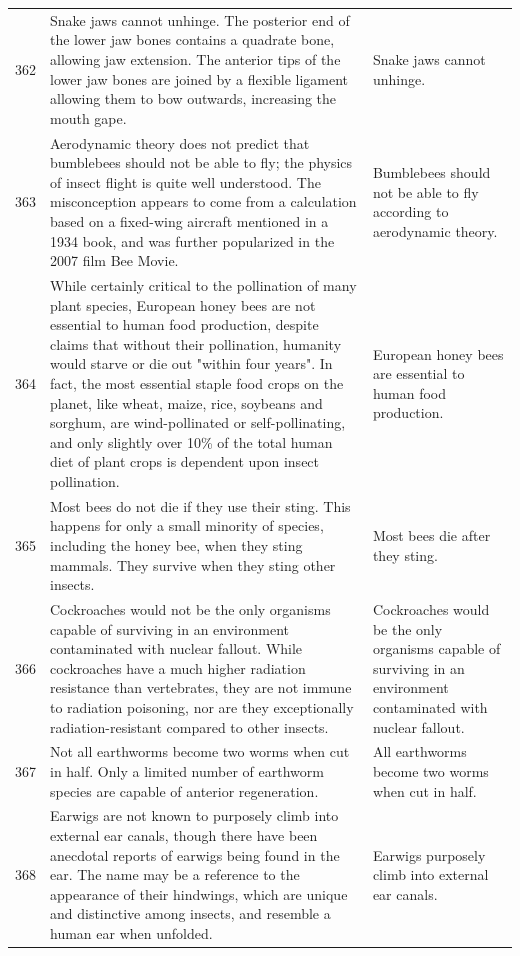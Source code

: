 \begin{tabular}{c|p{}|p{}}
362 & Snake jaws cannot unhinge. The posterior end of the lower jaw bones contains a quadrate bone, allowing jaw extension. The anterior tips of the lower jaw bones are joined by a flexible ligament allowing them to bow outwards, increasing the mouth gape. & Snake jaws cannot unhinge. \\
363 & Aerodynamic theory does not predict that bumblebees should not be able to fly; the physics of insect flight is quite well understood. The misconception appears to come from a calculation based on a fixed-wing aircraft mentioned in a 1934 book, and was further popularized in the 2007 film Bee Movie. & Bumblebees should not be able to fly according to aerodynamic theory. \\
364 & While certainly critical to the pollination of many plant species, European honey bees are not essential to human food production, despite claims that without their pollination, humanity would starve or die out "within four years". In fact, the most essential staple food crops on the planet, like wheat, maize, rice, soybeans and sorghum, are wind-pollinated or self-pollinating, and only slightly over 10\% of the total human diet of plant crops is dependent upon insect pollination. & European honey bees are essential to human food production. \\
365 & Most bees do not die if they use their sting. This happens for only a small minority of species, including the honey bee, when they sting mammals. They survive when they sting other insects. & Most bees die after they sting. \\
366 & Cockroaches would not be the only organisms capable of surviving in an environment contaminated with nuclear fallout. While cockroaches have a much higher radiation resistance than vertebrates, they are not immune to radiation poisoning, nor are they exceptionally radiation-resistant compared to other insects. & Cockroaches would be the only organisms capable of surviving in an environment contaminated with nuclear fallout. \\
367 & Not all earthworms become two worms when cut in half. Only a limited number of earthworm species are capable of anterior regeneration. & All earthworms become two worms when cut in half. \\
368 & Earwigs are not known to purposely climb into external ear canals, though there have been anecdotal reports of earwigs being found in the ear. The name may be a reference to the appearance of their hindwings, which are unique and distinctive among insects, and resemble a human ear when unfolded. & Earwigs purposely climb into external ear canals. \\

\end{tabular}
